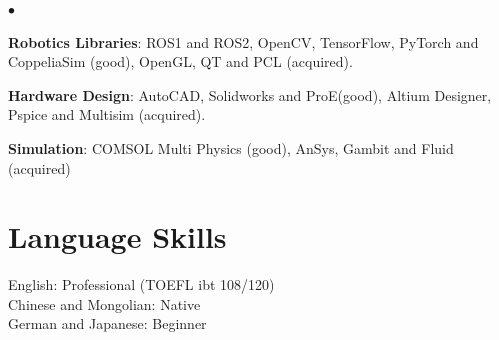 \documentclass[margin,line]{res}
\newenvironment{list2}{
  \begin{list}{$\bullet$}{%
      \setlength{\itemsep}{0in}
      \setlength{\parsep}{0in} \setlength{\parskip}{0in}
      \setlength{\topsep}{0in} \setlength{\partopsep}{0in} 
      \setlength{\leftmargin}{0.2in}}}{\end{list}}
\begin{document}
\begin{resume}
\begin{list2}
\item {\bf Robotics Libraries}: ROS1 and ROS2, OpenCV, TensorFlow, PyTorch and CoppeliaSim (good), OpenGL, QT and PCL (acquired).\\

\item {\bf Hardware Design}: AutoCAD, Solidworks and ProE(good), Altium Designer, Pspice and Multisim (acquired).\\

\item {\bf Simulation}: COMSOL Multi Physics (good), AnSys, Gambit and Fluid (acquired) \\
\end{list2}

\section{\sc Language Skills} 
English: Professional (TOEFL ibt 108/120)\\
Chinese and Mongolian: Native\\
German and Japanese: Beginner




%


%



\end{resume}
\end{document}
